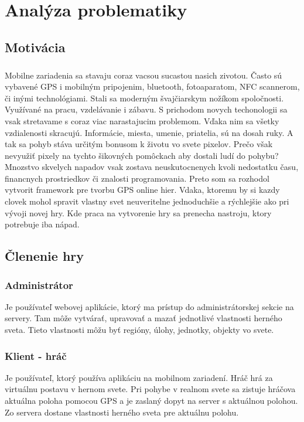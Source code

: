 \chapter{Analýza problematiky}
\section{Motivácia}
\paragraph{}
Mobilne zariadenia sa stavaju coraz vacsou sucastou nasich zivotou. Často sú vybavené GPS i mobilným pripojenim, bluetooth, fotoaparatom, NFC scannerom, či inými technológiami. Stali sa moderným švajčiarskym nožíkom spoločnosti. Využívané na pracu, vzdelávanie i zábavu. S prichodom novych techonologii sa vsak stretavame s coraz viac narastajucim problemom. Vďaka nim sa všetky vzdialenosti skracujú. Informácie, miesta, umenie, priatelia, sú na dosah ruky. A tak sa pohyb stáva určitým bonusom k životu vo svete pixelov. Prečo však nevyužiť pixely na tychto šikovných pomôckach aby dostali ludí do pohybu?\\
Mnozstvo skvelych napadov vsak zostava neuskutocnenych kvoli nedostatku času, financnych prostriedkov či znalosti programovania. Preto som sa rozhodol vytvorit framework pre tvorbu GPS online hier. Vdaka, ktoremu by si kazdy clovek mohol spravit vlastny svet neuveritelne jednoduchšie a rýchlejšie ako pri vývoji novej hry. Kde praca na vytvorenie hry sa prenecha nastroju, ktory potrebuje iba nápad.

\section{Členenie hry}
\subsection{Administrátor}
Je používateľ webovej aplikácie, ktorý ma prístup do administrátorskej sekcie na servery. Tam môže vytvárať, upravovať a mazať jednotlivé vlastnosti herného sveta. Tieto vlastnosti môžu byť regióny, úlohy, jednotky, objekty vo svete. 

\subsection{Klient - hráč}
Je používateľ, ktorý používa aplikáciu na mobilnom zariadení. Hráč hrá za virtuálnu postavu v hernom svete. Pri pohybe v realnom svete sa zistuje hráčova aktuálna poloha pomocou GPS a je zaslaný dopyt na server s aktuálnou polohou. Zo servera dostane vlastnosti herného sveta pre aktuálnu polohu.

